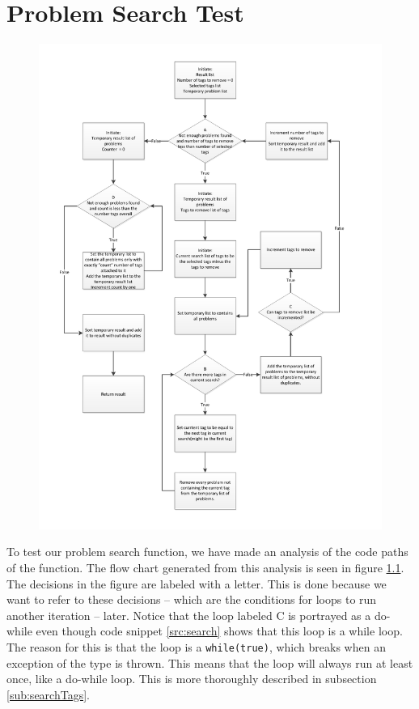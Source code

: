 \chapter{Problem Search Test}
\label{chap:problem_search_test}
\begin{figure}[b]
	\centering
		\includegraphics[width=1.00\textwidth]{input/testing/problem_search.pdf}
	\label{fig:problem_search}
\end{figure}

To test our problem search function, we have made an analysis of the code paths of the function.
The flow chart generated from this analysis is seen in figure \ref{fig:problem_search}.
The decisions in the figure are labeled with a letter.
This is done because we want to refer to these decisions -- which are the conditions for loops to run another iteration -- later.
Notice that the loop labeled C is portrayed as a do-while even though code snippet \ref{src:search} shows that this loop is a while loop.
The reason for this is that the loop is a \verb|while(true)|, which breaks when an exception of the type  is thrown.
This means that the loop will always run at least once, like a do-while loop.
This is more thoroughly described in subsection \ref{sub:searchTags}.

